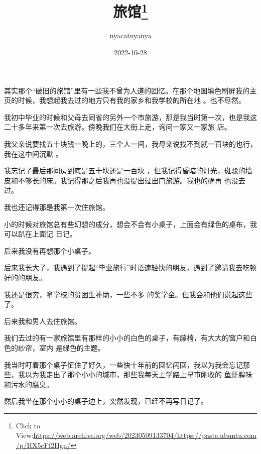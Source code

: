 \documentclass{article}
\title{旅馆\footnote{Click to View:\url{https://web.archive.org/web/20230509133704/https://paste.ubuntu.com/p/HX5cFf2Hgn/}}}
\author{nyacatnyanya}
\date{2022-10-28}
\begin{document}

\maketitle


\Large

﻿其实那个“破旧的旅馆”里有一些我不曾为人道的回忆。在那个地图填色刷屏我的主页的时候，我想起我去过的地方只有我的家乡和我学校的所在地
。也不尽然。 

我初中毕业的时候和父母去同省的另外一个市旅游，那是我当时第一次，也是我这二十多年来第一次去旅游。傍晚我们在大街上走，询问一家又一家旅
店。 

我父亲说要找五十块钱一晚上的，三个人一间，我母亲说找不到就一百块的也行，我在这中间沉默
。 

我忘记了最后那间房到底是五十块还是一百块
\newpage
，但我记得昏暗的灯光，斑驳的墙皮和不够长的床。我记得那之后我再也没提出过出门旅游。我也的确再
也没去过。 


我也还记得那是我第一次住旅馆。 

小的时候对旅馆总有些幻想的成分，想会不会有小桌子，上面会有绿色的桌布，我可以趴在上面记
日记。 


后来我没有再想那个小桌子。 

后来我长大了，我遇到了提起“毕业旅行”时语速轻快的朋友，遇到了邀请我去吃顿好的的朋友。
 

我还是很穷，拿学校的贫困生补助，一些不多
的奖学金。但我会和他们说起这些了。 


后来我和男人去住旅馆。 

\newpage

我们去过的有一家旅馆里有那样的小小的白色的桌子，有藤椅，有大大的窗户和白色的纱帘，室内
是绿色的主题。 

我当时盯着那个桌子怔住了好久，一些快十年前的回忆闪回，我以为我会忘记那些，我以为我走出了那个小小的城市，那些我每天上学路上早市刚收的
鱼虾腥味和污水的腐臭。 

然后我坐在那个小小的桌子边上，突然发现，已经不再写日记了。
\end{document}
